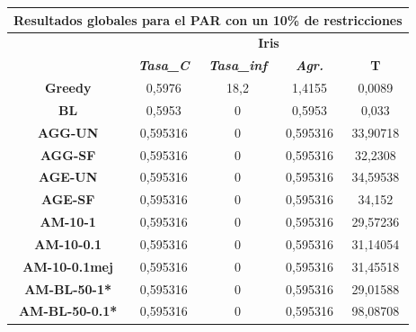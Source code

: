 \documentclass[12pt, spanish]{article}
\begin{document}
\begin{table}[H]
\centering
\begin{tabular}{|c|c|c|c|c|}
\hline
\multicolumn{5}{|c|}{\textbf{Resultados globales para el PAR con un 10\% de restricciones}}                                 \\ \hline
\multirow{2}{*}{}           & \multicolumn{4}{c|}{\textbf{Iris}}                                                            \\ \cline{2-5} 
                            & \textit{\textbf{Tasa\_C}} & \textit{\textbf{Tasa\_inf}} & \textit{\textbf{Agr.}} & \textbf{T} \\ \hline
\textbf{Greedy}             & 0,5976                    & 18,2                        & 1,4155                 & 0,0089     \\ \hline
\textbf{BL}                 & 0,5953                    & 0                           & 0,5953                 & 0,033      \\ \hline
\textbf{AGG-UN}             & 0,595316                  & 0                           & 0,595316               & 33,90718   \\ \hline
\textbf{AGG-SF}             & 0,595316                  & 0                           & 0,595316               & 32,2308    \\ \hline
\textbf{AGE-UN}             & 0,595316                  & 0                           & 0,595316               & 34,59538   \\ \hline
\textbf{AGE-SF}             & 0,595316                  & 0                           & 0,595316               & 34,152     \\ \hline
\textbf{AM-10-1}            & 0,595316                  & 0                           & 0,595316               & 29,57236   \\ \hline
\textbf{AM-10-0.1}          & 0,595316                  & 0                           & 0,595316               & 31,14054   \\ \hline
\textbf{AM-10-0.1mej}       & 0,595316                  & 0                           & 0,595316               & 31,45518   \\ \hline
\textbf{AM-BL-50-1*}        & 0,595316                  & 0                           & 0,595316               & 29,01588   \\ \hline
\textbf{AM-BL-50-0.1*}      & 0,595316                  & 0                           & 0,595316               & 98,08708   \\ \hline

\end{tabular}
\end{table}
\end{document}
